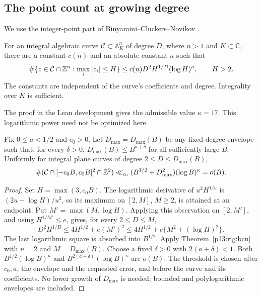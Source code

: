 \subsection{The point count at growing degree}

We use the integer-point part of Binyamini--Cluckers--Novikov
\cite[Theorem~2, equation~(27), in the specified author
version]{binyaminicluckersnovikov2024}.

\begin{theorem}
\label{p13:rig:bcn}
For an integral algebraic curve $\mathcal C\subset\mathbb A^n_K$
of degree $D$, where $n>1$ and $K\subset\mathbb C$, there are
a constant $c(n)$ and an absolute constant $\kappa$ such that
\[
 \#\{z\in\mathcal C\cap\mathbb Z^n:\max_i|z_i|\le H\}
       \le c(n)D^2H^{1/D}(\log H)^\kappa,
       \qquad H>2.
\]
The constants are independent of the curve's coefficients
and degree.  Integrality over $K$ is sufficient.
\end{theorem}

The proof in the Lean development gives the admissible value
$\kappa=17$. This logarithmic power need not be optimized here.

\begin{corollary}
\label{p13:rig:sublinear-grid}
Fix $0\le a<1/2$ and $c_0>0$. Let $D_{\max}=D_{\max}(B)$
be any fixed degree envelope such that, for every $\delta>0$,
$D_{\max}(B)\le B^{a+\delta}$ for all sufficiently large $B$.
Uniformly for integral plane curves of degree $2\le D\le D_{\max}(B)$,
\[
 \#(\mathcal C\cap[-c_0B,c_0B]^2\cap\mathbb Z^2)
 \ll_{c_0}(B^{1/2}+D_{\max}^2)(\log B)^\kappa=o(B).
\]
\end{corollary}

\begin{proof}
Set $H=\max(3,c_0B)$.  The logarithmic derivative of
$u^2H^{1/u}$ is $(2u-\log H)/u^2$, so its maximum on
$[2,M]$, $M\ge2$, is attained at an endpoint.
Put $M'=\max(M,\log H)$. Applying this observation on $[2,M']$,
and using $H^{1/M'}\le e$, gives, for every $2\le D\le M$,
\[
 D^2H^{1/D}
 \le 4H^{1/2}+e(M')^2
 \le4H^{1/2}+e\{M^2+(\log H)^2\}.
\]
The last logarithmic square is absorbed into $B^{1/2}$.
Apply Theorem~\ref{p13:rig:bcn} with $n=2$ and $M=D_{\max}(B)$.
Choose a fixed $\delta>0$ with $2(a+\delta)<1$. Both
$B^{1/2}(\log B)^\kappa$ and
$B^{2(a+\delta)}(\log B)^\kappa$ are $o(B)$.
The threshold is chosen after $c_0,a$, the envelope and the requested
error, and before the curve and its coefficients. No lower growth of
$D_{\max}$ is needed; bounded and polylogarithmic envelopes are included.
\end{proof}

